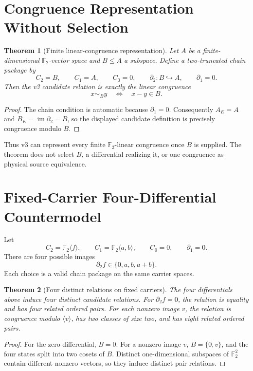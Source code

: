 \documentclass[11pt]{article}
\newtheorem{theorem}{Theorem}
\newcommand{\Ftwo}{\mathbb F_2}
\begin{document}
\section{Congruence Representation Without Selection}

\begin{theorem}[Finite linear-congruence representation]
Let \(A\) be a finite-dimensional \(\Ftwo\)-vector space and \(B\leq A\) a
subspace. Define a two-truncated chain package by
\[
 C_2=B,\qquad C_1=A,\qquad C_0=0,\qquad
 \partial_2:B\hookrightarrow A,\qquad\partial_1=0.
\]
Then the v3 candidate relation is exactly the linear congruence
\[
 x\sim_B y\quad\Longleftrightarrow\quad x-y\in B.
\]
\end{theorem}

\begin{proof}
The chain condition is automatic because \(\partial_1=0\).
Consequently \(A_E=A\) and \(B_E=\operatorname{im}\partial_2=B\), so the
displayed candidate definition is precisely congruence modulo \(B\).
\end{proof}

Thus v3 can represent every finite \(\Ftwo\)-linear congruence once \(B\) is
supplied. The theorem does not select \(B\), a differential realizing it, or
one congruence as physical source equivalence.

\section{Fixed-Carrier Four-Differential Countermodel}

Let
\[
 C_2=\Ftwo\langle f\rangle,\qquad
 C_1=\Ftwo\langle a,b\rangle,\qquad C_0=0,\qquad \partial_1=0.
\]
There are four possible images
\[
 \partial_2 f\in\{0,a,b,a+b\}.
\]
Each choice is a valid chain package on the same carrier spaces.

\begin{theorem}[Four distinct relations on fixed carriers]
The four differentials above induce four distinct candidate relations. For
\(\partial_2f=0\), the relation is equality and has four related ordered
pairs. For each nonzero image \(v\), the relation is congruence modulo
\(\langle v\rangle\), has two classes of size two, and has eight related
ordered pairs.
\end{theorem}

\begin{proof}
For the zero differential, \(B=0\). For a nonzero image \(v\),
\(B=\{0,v\}\), and the four states split into two cosets of \(B\). Distinct
one-dimensional subspaces of \(\Ftwo^2\) contain different nonzero vectors,
so they induce distinct pair relations.
\end{proof}
\end{document}
